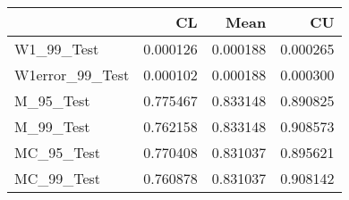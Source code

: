 \begin{tabular}{lrrr}
\toprule
{} &        CL &      Mean &        CU \\
\midrule
W1\_99\_Test      &  0.000126 &  0.000188 &  0.000265 \\
W1error\_99\_Test &  0.000102 &  0.000188 &  0.000300 \\
M\_95\_Test       &  0.775467 &  0.833148 &  0.890825 \\
M\_99\_Test       &  0.762158 &  0.833148 &  0.908573 \\
MC\_95\_Test      &  0.770408 &  0.831037 &  0.895621 \\
MC\_99\_Test      &  0.760878 &  0.831037 &  0.908142 \\
\bottomrule
\end{tabular}
